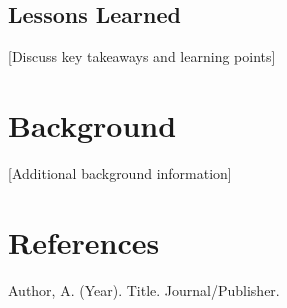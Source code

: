 \documentclass[12pt,a4paper]{article}
\begin{document}
\subsection{Lessons Learned}
[Discuss key takeaways and learning points]

\begin{appendices}
\section{Background}
[Additional background information]

\section{References}
\begin{thebibliography}{9}
     Author, A. (Year). Title. Journal/Publisher.
\end{thebibliography}
\end{appendices}
\end{document}
